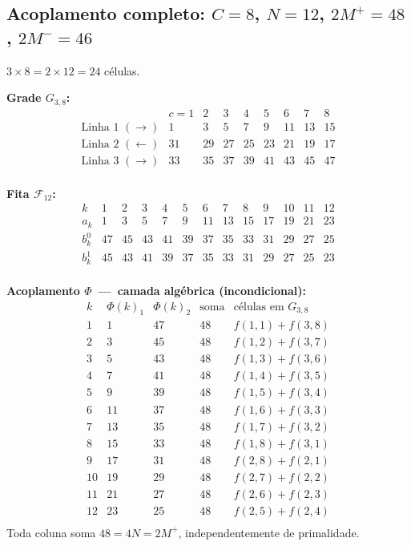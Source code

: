 \documentclass[12pt, a4paper]{article}
\theoremstyle{plain}
\theoremstyle{definition}
\theoremstyle{remark}
\begin{document}
	\subsection{Acoplamento completo: $C=8$, $N=12$, $2M^+=48$,
		$2M^-=46$}
	
	$3\times8=2\times12=24$ células. \checkmark
	
	\medskip\noindent\textbf{Grade $G_{3,8}$:}
	\[
	\begin{array}{c|cccccccc}
		& c=1&2&3&4&5&6&7&8\\
		\hline
		\text{Linha~1 }(\rightarrow) & 1&3&5&7&9&11&13&15\\
		\text{Linha~2 }(\leftarrow)  &31&29&27&25&23&21&19&17\\
		\text{Linha~3 }(\rightarrow) &33&35&37&39&41&43&45&47\\
	\end{array}
	\]
	
	\medskip\noindent\textbf{Fita $\mathcal{F}_{12}$:}
	\[
	\begin{array}{c|cccccccccccc}
		k & 1&2&3&4&5&6&7&8&9&10&11&12\\
		\hline
		a_k   &1&3&5&7&9&11&13&15&17&19&21&23\\
		b_k^0 &47&45&43&41&39&37&35&33&31&29&27&25\\
		b_k^1 &45&43&41&39&37&35&33&31&29&27&25&23\\
	\end{array}
	\]
	
	\medskip\noindent\textbf{Acoplamento $\Phi$~---~camada algébrica
		(incondicional):}
	\[
	\begin{array}{c|cc|c|c}
		k & \Phi(k)_1 & \Phi(k)_2 & \text{soma} & \text{células em }G_{3,8}\\
		\hline
		1  & 1  & 47 & 48 & f(1,1)+f(3,8)\\
		2  & 3  & 45 & 48 & f(1,2)+f(3,7)\\
		3  & 5  & 43 & 48 & f(1,3)+f(3,6)\\
		4  & 7  & 41 & 48 & f(1,4)+f(3,5)\\
		5  & 9  & 39 & 48 & f(1,5)+f(3,4)\\
		6  & 11 & 37 & 48 & f(1,6)+f(3,3)\\
		7  & 13 & 35 & 48 & f(1,7)+f(3,2)\\
		8  & 15 & 33 & 48 & f(1,8)+f(3,1)\\
		9  & 17 & 31 & 48 & f(2,8)+f(2,1)\\
		10 & 19 & 29 & 48 & f(2,7)+f(2,2)\\
		11 & 21 & 27 & 48 & f(2,6)+f(2,3)\\
		12 & 23 & 25 & 48 & f(2,5)+f(2,4)\\
	\end{array}
	\]
	Toda coluna soma $48=4N=2M^+$, independentemente de primalidade. \checkmark
	
\end{document}
